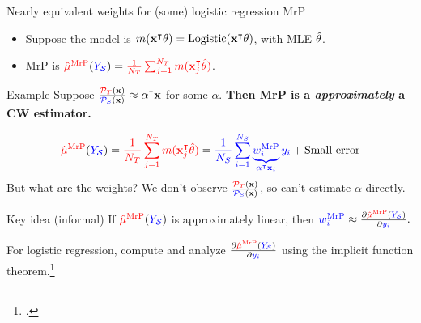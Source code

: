\begin{frame}[t]{Nearly equivalent weights for (some) logistic regression MrP}

\def\alphav{\mathbf{\alpha}}
%
\begin{itemize}
    \item Suppose the model is $m(\mathbf{x}^\intercal \theta) = \mathrm{Logistic}(\mathbf{x}^\intercal \theta)$, with MLE $\hat{\theta}$.
    \item MrP is $\textcolor{red}{\hat{\mu}^{\mathrm{MrP}}}(\textcolor{blue}{\textcolor{blue}{Y_{\mathcal{S}}}}) = \textcolor{red}{\frac{1}{{N_T}} \sum_{j=1}^{N_T} m(\mathbf{x}_j^\intercal \hat{\theta})}$.
\end{itemize}
%
\begin{block}{Example}
Suppose
    $\frac{\ptar(\x)}{\psur(\x)} \approx \alphav^\trans \x$ for some $\alpha$.
    \textbf{Then MrP is a \emph{approximately} a CW estimator.}
\end{block}

$$
\begin{aligned}
\muhatmrp =
    \tarcol{\meantar \m(\x_j^\trans \thetahat)} ={}
    \surcol{
        \meansur
        \underbrace{\w_i^\mrp}_{\alphav^\trans \x_i} \y_i
    }  + \textrm{Small error}
\end{aligned}
$$
\pause
But what are the weights?
We don't observe $\frac{\textcolor{red}{\mathcal{P}_{T}}(\mathbf{x})}{\textcolor{blue}{{\mathcal{P}_{S}}}(\mathbf{x})}$, so can't estimate $\alpha$
directly.\pause

\begin{block}{Key idea (informal)}
\centering
If $\textcolor{red}{\hat{\mu}^{\mathrm{MrP}}}(\textcolor{blue}{\textcolor{blue}{Y_{\mathcal{S}}}})$ is approximately linear, then
$\textcolor{blue}{w_i^{\mathrm{MrP}}} \approx \frac{\partial \textcolor{red}{\hat{\mu}^{\mathrm{MrP}}}(\textcolor{blue}{\textcolor{blue}{Y_{\mathcal{S}}}})}{\partial \textcolor{blue}{y_i}}.$\\
\end{block}\pause

For logistic regression, compute and analyze $\frac{\partial \textcolor{red}{\hat{\mu}^{\mathrm{MrP}}}(\textcolor{blue}{\textcolor{blue}{Y_{\mathcal{S}}}})}{\partial \textcolor{blue}{y_i}}$
using the implicit function theorem.\footcite{krantz:2012:implicit,giordano:2019:swiss}

\end{frame}




